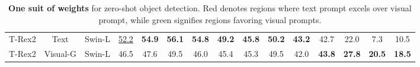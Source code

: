\begin{table}[t]
{\begin{tabular}{ccc|c|cccccccc|cc|c}
      T-Rex2                  & Text                                                                    & Swin-L                    & \cellcolor{red!5}\underline{52.2}                                        & \cellcolor{red!5}\textbf{54.9} & \cellcolor{red!5}\textbf{56.1} & \cellcolor{red!5}\textbf{54.8} & \multicolumn{1}{c|}{\cellcolor{red!5}\textbf{49.2}} & \cellcolor{red!5}\textbf{45.8} & \cellcolor{red!5}\textbf{50.2} & \cellcolor{red!5}\textbf{43.2} & \cellcolor{green!5}42.7          & \cellcolor{green!5}22.0                                   & \cellcolor{green!5}7.3                                   & \cellcolor{green!5}10.5                                                            \\
      T-Rex2                  & Visual-G                                                                & Swin-L                    & \cellcolor{red!5}46.5                                        & \cellcolor{red!5}47.6          & \cellcolor{red!5}49.5          & \cellcolor{red!5}46.0          & \multicolumn{1}{c|}{\cellcolor{red!5}45.4}          & \cellcolor{red!5}45.3          & \cellcolor{red!5}49.5          & \cellcolor{red!5}42.0          & \cellcolor{green!5}\textbf{43.8} & \cellcolor{green!5}\textbf{27.8}                          & \cellcolor{green!5}\textbf{20.5}                         & \cellcolor{green!5}\textbf{18.5}                                                   \\ \hline
      \end{tabular}}
  \caption{\textbf{One suit of weights} for zero-shot object detection. \textcolor{red!25}{Red} denotes regions where text prompt excels over visual prompt, while \textcolor{green!45}{green} signifies regions favoring visual prompts.}
  \vspace{-1.5em}
  \label{tab:main_result}
  \end{table}


